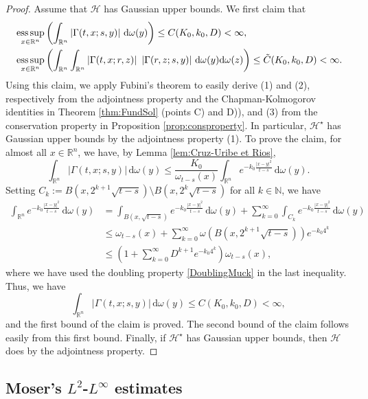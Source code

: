 \documentclass[12pt, letterpaper]{amsart}
\theoremstyle{definition}
\theoremstyle{remark}
\numberwithin{equation}{section}
\DeclareMathOperator*{\supess}{ess\,sup}
\begin{document}
\begin{proof}
Assume that $\mathcal{H}$ has Gaussian upper bounds. We first claim that
\begin{align*}
    &\supess_{x \in \mathbb{R}^n} \left( \int_{\mathbb{R}^n} \left| \Gamma(t,x;s,y) \right| \, \mathrm{d}\omega(y) \right) \leq C(K_0, k_0, D) < \infty,
    \\ &\supess_{x \in \mathbb{R}^n} \left( \int_{\mathbb{R}^n} \int_{\mathbb{R}^n} \left| \Gamma(t,x;r,z) \right| \ \left| \Gamma(r,z;s,y) \right| \, \mathrm{d}\omega(y) \mathrm{d}\omega(z) \right) \leq \Tilde{C}(K_0, k_0, D) < \infty.
\end{align*}
Using this claim, we apply Fubini's theorem to easily derive (1) and (2), respectively from the adjointness property and the Chapman-Kolmogorov identities in Theorem \ref{thm:FundSol} (points C) and D)), and (3) from the conservation property in Proposition \ref{prop:consproperty}. In particular, $\mathcal{H}^\star$ has Gaussian upper bounds by the adjointness property (1). To prove the claim, for almost all $x \in \mathbb{R}^n$, we have, by Lemma \ref{lem:Cruz-Uribe et Rios},
$$ \int_{\mathbb{R}^n} \left| \Gamma(t,x;s,y) \right| \, \mathrm{d}\omega(y) \leq \frac{K_0}{\omega_{t-s}(x)} \int_{\mathbb{R}^n} e^{-k_0 \frac{|x-y|^2}{t-s}} \, \mathrm{d}\omega(y). $$
Setting $C_k := B(x, 2^{k+1} \sqrt{t-s}) \setminus B(x, 2^k \sqrt{t-s})$ for all $k \in \mathbb{N}$, we have
\begin{align*}
    \int_{\mathbb{R}^n} e^{-k_0 \frac{|x-y|^2}{t-s}} \, \mathrm{d}\omega(y) 
    &= \int_{B(x, \sqrt{t-s})} e^{-k_0 \frac{|x-y|^2}{t-s}} \, \mathrm{d}\omega(y)  + \sum_{k=0}^{\infty} \int_{C_k} e^{-k_0 \frac{|x-y|^2}{t-s}} \, \mathrm{d}\omega(y) \\
    &\leq \omega_{t-s}(x) + \sum_{k=0}^{\infty} \omega(B(x, 2^{k+1} \sqrt{t-s})) e^{-k_0 4^k} \\
    &\leq \left( 1 + \sum_{k=0}^{\infty} D^{k+1} e^{-k_0 4^k} \right) \omega_{t-s}(x),
\end{align*}
where we have used the doubling property \eqref{DoublingMuck} in the last inequality. Thus, we have
$$ \int_{\mathbb{R}^n} \left| \Gamma(t,x;s,y) \right| \, \mathrm{d}\omega(y) \leq C(K_0, k_0, D) < \infty, $$
and the first bound of the claim is proved. The second bound of the claim follows easily from this first bound. Finally, if $\mathcal{H}^\star$ has Gaussian upper bounds, then $\mathcal{H}$ does by the adjointness property. 
\end{proof}

\subsection{Moser’s \texorpdfstring{$L^2$}{L2}-\texorpdfstring{$L^\infty$}{Linfini} estimates }
\end{document}
